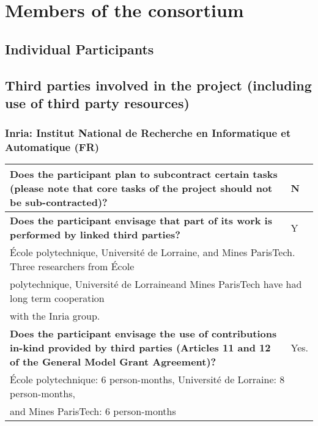 \chapter{Members of the consortium}

\section{Individual Participants}
\label{sec:partners}






























\section{Third parties involved in the project (including use of third party resources)}

\subsection*{Inria: Institut National de Recherche en Informatique et
  Automatique (FR)}

\begin{longtable}{|p{}|p{}|}
\hline
{\bf Does the participant plan to subcontract certain tasks (please
  note that core tasks of the project should not be sub-contracted)?}
&
N
\\
\hline
{\bf Does the participant envisage that  part of its work is performed
  by linked third parties?}
&
Y
\\
\hline
\multicolumn{2}{|l|}{
  École polytechnique, Université de Lorraine, and Mines ParisTech.
  Three researchers from École}\\
\multicolumn{2}{|l|}{
  polytechnique, Université de Lorraineand  Mines ParisTech   have had long term cooperation}\\
\multicolumn{2}{|l|}{
  with the Inria group.}
\\
\hline
{\bf Does the participant envisage the use of contributions in-kind
provided by third parties (Articles 11 and 12 of the General Model
Grant Agreement)?}
&
Yes. 
\\
\hline
\multicolumn{2}{|l|}{
École polytechnique: 6 person-months, 
Université de Lorraine: 8 person-months,}
\\
\multicolumn{2}{|l|}{
and Mines ParisTech: 6 person-months}
\\
\hline
\end{longtable}

